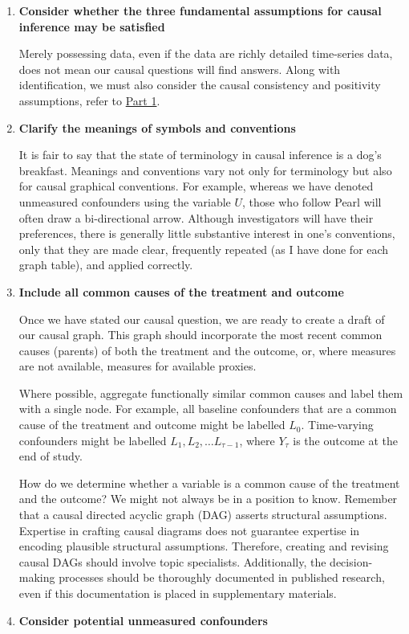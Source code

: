 \documentclass[
  single column]{article}
\begin{document}
\begin{enumerate}
\def\labelenumi{\arabic{enumi}.}
\setcounter{enumi}{1}
\item
  \textbf{Consider whether the three fundamental assumptions for causal
  inference may be satisfied}

  Merely possessing data, even if the data are richly detailed
  time-series data, does not mean our causal questions will find
  answers. Along with identification, we must also consider the causal
  consistency and positivity assumptions, refer to
  \hyperref[id-sec-1]{Part 1}.
\item
  \textbf{Clarify the meanings of symbols and conventions}

  It is fair to say that the state of terminology in causal inference is
  a dog's breakfast. Meanings and conventions vary not only for
  terminology but also for causal graphical conventions. For example,
  whereas we have denoted unmeasured confounders using the variable
  \(U\), those who follow Pearl will often draw a bi-directional arrow.
  Although investigators will have their preferences, there is generally
  little substantive interest in one's conventions, only that they are
  made clear, frequently repeated (as I have done for each graph table),
  and applied correctly.
\item
  \textbf{Include all common causes of the treatment and outcome}

  Once we have stated our causal question, we are ready to create a
  draft of our causal graph. This graph should incorporate the most
  recent common causes (parents) of both the treatment and the outcome,
  or, where measures are not available, measures for available proxies.

  Where possible, aggregate functionally similar common causes and label
  them with a single node. For example, all baseline confounders that
  are a common cause of the treatment and outcome might be labelled
  \(L_0\). Time-varying confounders might be labelled
  \(L_1, L_2, \dots L_{\tau -1}\), where \(Y_\tau\) is the outcome at
  the end of study.

  How do we determine whether a variable is a common cause of the
  treatment and the outcome? We might not always be in a position to
  know. Remember that a causal directed acyclic graph (DAG) asserts
  structural assumptions. Expertise in crafting causal diagrams does not
  guarantee expertise in encoding plausible structural assumptions.
  Therefore, creating and revising causal DAGs should involve topic
  specialists. Additionally, the decision-making processes should be
  thoroughly documented in published research, even if this
  documentation is placed in supplementary materials.
\item
  \textbf{Consider potential unmeasured confounders}


\end{enumerate}
\end{document}
